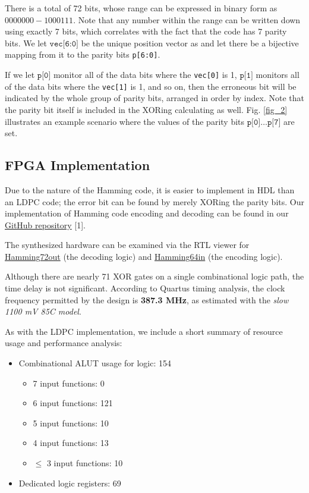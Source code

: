 \documentclass[conference]{IEEEtran}
\begin{document}
There is a total of 72 bits, whose range can be expressed in binary form as
$0000000-1000111$. Note that any number within the range can be written down using exactly 7 bits,
which correlates with the fact that the code has 7 parity bits.
We let $\texttt{vec[6:0]}$ be the unique position vector as and let there be a bijective mapping from it to the parity bits \texttt{p[6:0]}.

If we let $\texttt{p[0]}$ monitor all of the data bits where the \texttt{vec[0]} is 1, $\texttt{p[1]}$ monitors all of the data bits where the \texttt{vec[1]} is 1, and so on, then the erroneous bit will be indicated by the whole group of parity bits, arranged in order by index.
Note that the parity bit itself is included in the XORing calculating as well.
Fig. \ref{fig_2} illustrates an example scenario where the values of the parity bits $\texttt{p[0]}\ldots\texttt{p[7]}$ are set.

\subsection{FPGA Implementation}
Due to the nature of the Hamming code, it is easier to implement in HDL than an LDPC code; the error bit can be found by merely XORing the parity bits. Our implementation of Hamming code encoding and decoding can be
found in our \href{https://github.com/luckunately/ELEC433-Projects}{GitHub
  repository} [1]. %

The synthesized hardware can be examined via the RTL viewer for \href{https://github.com/luckunately/ELEC433-Projects/blob/add-tex/Hamming72out/Hamming72out_RTL.pdf}{Hamming72out} (the decoding logic) and \href{https://github.com/luckunately/ELEC433-Projects/blob/add-tex/Hamming64in/Hamming64inRTL.pdf}{Hamming64in} (the encoding logic).

Although there are nearly 71 XOR gates on a single combinational logic path, the time delay is not significant. According to Quartus timing analysis, the clock frequency permitted by the design is \textbf{387.3 MHz}, as estimated with the \textit{slow 1100 mV 85C model}.

As with the LDPC implementation, we include a short summary of resource usage and performance analysis:
\begin{itemize}
  \item Combinational ALUT usage for logic: 154
  \begin{itemize}
    \item 7 input functions: 0
    \item 6 input functions: 121
    \item 5 input functions: 10
    \item 4 input functions: 13
    \item $\leq$ 3 input functions: 10
  \end{itemize}
  \item Dedicated logic registers: 69
\end{itemize}
\end{document}
